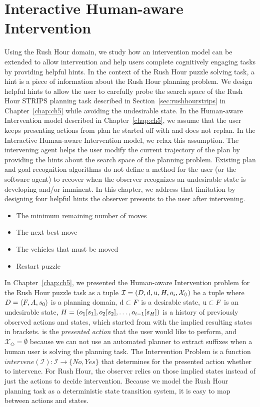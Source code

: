 \chapter{Interactive Human-aware Intervention}
\label{chap:ch6}
Using the Rush Hour domain, we study how an intervention model can be extended to allow intervention and help users complete cognitively engaging tasks by providing helpful hints. 
In the context of the Rush Hour puzzle solving task, a hint is a piece of information about the Rush Hour planning problem. 
We design helpful hints to allow the user to carefully probe the search space of the Rush Hour STRIPS planning task described in Section~\ref{sec:rushhourstrips} in
Chapter~\ref{chap:ch5} while avoiding the undesirable state.
In the Human-aware Intervention model described in Chapter~\ref{chap:ch5}, we assume that the user keeps presenting actions from plan he started off with and does not replan.
In the Interactive Human-aware Intervention model, we relax this assumption.
The intervening agent helps the user modify the current trajectory of the plan by providing the hints about the search space of the planning problem.
Existing plan and goal recognition algorithms do not define a method for the user (or the software agent) to recover when the observer recognizes an undesirable state is developing and/or imminent.
In this chapter, we address that limitation by designing four helpful hints the observer presents to the user after intervening.
\begin{itemize}
\item The minimum remaining number of moves
\item The next best move
\item The vehicles that must be moved
\item Restart puzzle
\end{itemize}


In Chapter~\ref{chap:ch5}, we presented the Human-aware Intervention problem for the Rush Hour puzzle task as a tuple
$\mathcal{I} = (D, \mathrm{d}, \mathrm{u}, H, o_i, \mathcal{X}_\Diamond)$ be a tuple where
  $D=\langle F, A, s_0 \rangle$ is a planning domain,
  $\mathrm{d} \subset F$ is a desirable state,
  $\mathrm{u} \subset F$ is an undesirable state,
  $H = ( o_1 [s_1], o_2 [s_2], \ldots, o_{i-1} [s_{H}])$ is a history of previously observed actions and states, which started from \initialState with the implied resulting states in brackets.
  \presentedAction is the \emph{presented action} that the user would like to perform, and
  $\mathcal{X}_\Diamond = \emptyset$ because we can not use an automated planner to extract suffixes when a human user is solving the planning task.
The \textnormal{Intervention Problem} is a function $intervene (\mathcal{I}) :  \mathcal{I} \rightarrow \{No, Yes\} $
that determines for the presented action \presentedAction whether to intervene.
For Rush Hour, the observer relies on those implied states instead of just the actions to decide intervention.
Because we model the Rush Hour planning task as a deterministic state transition system,  it is easy to map between actions and states.

